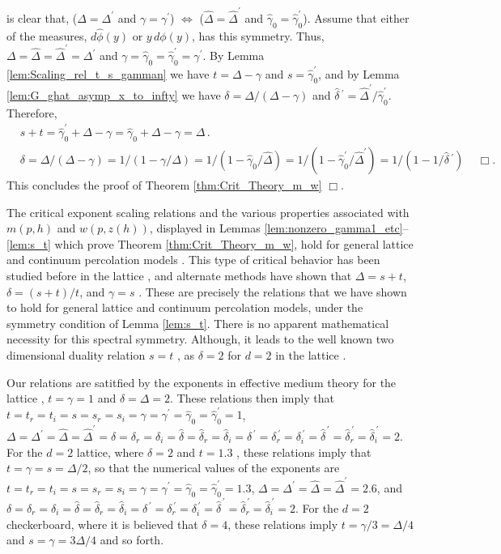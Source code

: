 \documentclass[english,12pt,jmp,graphicx]{revtex4-1}
\newcommand{\ph}{\hat{\phi}}
\newcommand{\gh}{\hat{\gamma}}
\newcommand{\Dh}{\hat{\Delta}}
\newcommand{\dha}{\hat{\delta}}
\begin{document}
is clear that, ($\Delta=\Delta^\prime$ and $\gamma=\gamma^\prime$) $\iff$ ($\Dh=\Dh^\prime$ and
$\gh_0=\gh_0^\prime$). Assume that either of the measures, $d\ph(y)$
or $y\,d\phi(y)$, has this symmetry. Thus, $\Delta=\Dh=\Dh^\prime=\Delta^\prime$ and
$\gamma=\gh_0=\gh_0^\prime=\gamma^\prime$. By
Lemma \ref{lem:Scaling_rel_t_s_gamman} we have $t=\Delta-\gamma$ and
$s=\gh_0^\prime$, and by Lemma \ref{lem:G_ghat_asymp_x_to_infty} we have
$\delta=\Delta/(\Delta-\gamma)$ and $\dha\,^\prime=\Dh^\prime/\gh_0^\prime$. Therefore,    
%
\begin{align*}
  &s+t=\gh_0^\prime+\Delta-\gamma=\gh_0+\Delta-\gamma=\Delta\,.\\
  &\delta=\Delta/(\Delta-\gamma)=1/(1-\gamma/\Delta)=1/(1-\gh_0/\Dh)=1/(1-\gh_0^\prime/\Dh^\prime)=1/(1-1/\dha\,^\prime)\,
  \quad \Box.
\end{align*}
\noindent This concludes the proof of Theorem
\ref{thm:Crit_Theory_m_w} $\Box$.

The critical exponent scaling relations and the various properties
associated with $m(p,h)$ and $w(p,z(h))$, displayed in Lemmas
\ref{lem:nonzero_gamma1_etc}--\ref{lem:s_t} which
prove Theorem \ref{thm:Crit_Theory_m_w}, hold for general lattice and
continuum percolation models
\cite{Golden:CMP-473,Golden:PRL-3935}. This type of critical behavior
has been studied before in the lattice
\cite{Efros:PSSB-303,Clerc:AP-191,Bergman:SSP-147}, and alternate
methods have shown that $\Delta=s+t$, $\delta=(s+t)/t$, and $\gamma=s$
\cite{Golden:PRL-3935}. These are precisely the relations that we have
shown to hold for general lattice and continuum percolation models,
under the symmetry condition of Lemma \ref{lem:s_t}. There is no
apparent mathematical necessity for this spectral symmetry. Although,
it leads to the well known two dimensional duality relation $s=t$
\cite{Bergman:SSP-147,Clerc:AP-191}, as $\delta=2$ for $d=2$ in the lattice 
\cite{Efros:PSSB-303,Stauffer-92}. 

Our relations are satitfied by the exponents in effective medium
theory for the lattice \cite{Day:JPCM-96}, $t=\gamma=1$ and $\delta=\Delta=2$. These
relations then imply that $t=t_r=t_i=s=s_r=s_i=\gamma=\gamma^\prime=\gh_0=\gh_0^\prime=1$,
$\Delta=\Delta^\prime=\Dh=\Dh^\prime=\delta=\delta_r=\delta_i=\dha=\dha_r=\dha_i=\delta^{\,\prime}=\delta_r^{\,\prime}=\delta_i^{\,\prime}=\dha^{\,\prime}=\dha_r^{\,\prime}=\dha_i^{\,\prime}=2$. For
the $d=2$ lattice, where $\delta=2$ and $t=1.3$ \cite{Stauffer-92}, these
relations imply that $t=\gamma=s=\Delta/2$, so that the numerical values of the 
exponents are $t=t_r=t_i=s=s_r=s_i=\gamma=\gamma^\prime=\gh_0=\gh_0^\prime=1.3$,
$\Delta=\Delta^\prime=\Dh=\Dh^\prime=2.6$, and
$\delta=\delta_r=\delta_i=\dha=\dha_r=\dha_i=\delta^{\,\prime}=\delta_r^{\,\prime}=\delta_i^{\,\prime}=\dha^{\,\prime}=\dha_r^{\,\prime}=\dha_i^{\,\prime}=2$. For
the $d=2$ checkerboard, where it is believed that $\delta=4$, these
relations imply $t=\gamma/3=\Delta/4$ and $s=\gamma=3\Delta/4$ and so forth. 
\end{document}

